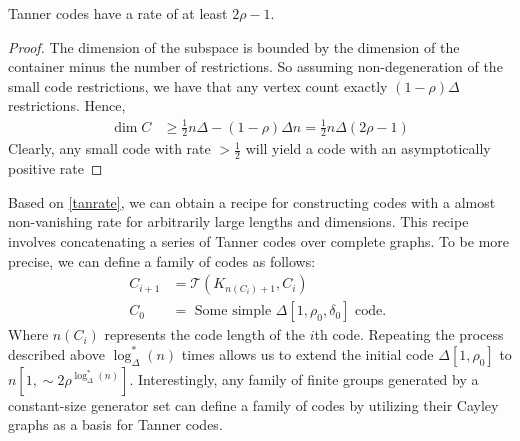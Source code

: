 \documentclass[12pt,a4paper]{article}
\begin{document}
  \begin{lemma}
\label{tanrate} Tanner codes have a rate of at least $2\rho - 1$.
\end{lemma}
  \begin{proof}  The dimension of the subspace is bounded by the dimension of the container minus the number of restrictions. So assuming non-degeneration of the small code restrictions, we have that any vertex count exactly $ \left( 1 - \rho  \right)\Delta $ restrictions. Hence, \begin{equation*}
    \begin{split}
      \dim C & \ge \frac{1}{2}n\Delta - \left( 1-\rho \right)\Delta n = \frac{1}{2}n\Delta\left( 2\rho - 1 \right)  
    \end{split}
  \end{equation*} Clearly, any small code with rate $> \frac{1}{2}$ will yield a code with an asymptotically positive rate \end{proof} 
  Based on \cref{tanrate}, we can obtain a recipe for constructing codes with a almost non-vanishing rate for arbitrarily large lengths and dimensions. This recipe involves concatenating a series of Tanner codes over complete graphs. To be more precise, we can define a family of codes as follows:
  \begin{equation*}
    \begin{split}
      C_{i+1} & = \mathcal{T}\left( K_{n(C_{i}) + 1}, C_{i} \right) \\
      C_{0} &= \text{ Some simple } \Delta[1, \rho_{0}, \delta_{0}] \text{ code. }
    \end{split}
  \end{equation*}
Where $n(C_i)$ represents the code length of the $i$th code. Repeating the process described above $\log_{\Delta}^{*}(n)$ times allows us to extend the initial code $\Delta[1,\rho_{0}]$ to $n[1, \sim 2\rho^{\log_{\Delta}^{*}(n)}]$. Interestingly, any family of finite groups generated by a constant-size generator set can define a family of codes by utilizing their Cayley graphs as a basis for Tanner codes.
\end{document}
